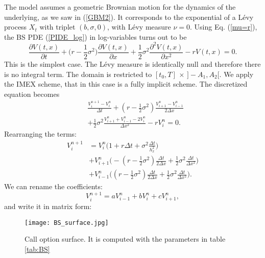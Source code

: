 The \cite{BS73} model assumes a geometric Brownian motion for the dynamics of the underlying, as we saw in (\ref{GBM2}).
It corresponds to the exponential of a Lévy process $X_t$ with triplet $(b,\sigma,0)$, with Lévy measure $\nu = 0$.
Using Eq. (\ref{mu=r}), the BS PDE (\ref{PIDE_log}) in log-variables turns out to be
\begin{equation}\label{BS_PDE}
\frac{\partial  V(t,x)}{\partial t}  
          + \biggl( r -\frac{1}{2}\sigma^2 \biggr) \frac{\partial V(t,x)}{\partial x}
          + \frac{1}{2} \sigma^2 \frac{\partial^2  V(t,x)}{\partial x^2} - r  V(t,x)  = 0.
\end{equation}
This is the simplest case. The Lévy measure is identically null and therefore there is no integral term.
The domain is restricted to $[t_0,T]\, \times \, ]-A_1,A_2[$. We apply the IMEX scheme, that in this case is a fully implicit scheme.  
The discretized equation becomes
\begin{align}
&\frac{V^{n+1}_{i} -V^{n}_{i}}{\Delta t} + 
(r-\frac{1}{2}\sigma^2) \frac{V^{n}_{i+1} -V^{n}_{i-1}}{ 2 \Delta x} \\ \nonumber
&+ \frac{1}{2} \sigma^2 \frac{V^{n}_{i+1} + V^{n}_{i-1} - 2 V^{n}_{i}}{\Delta x^2}  - r V^{n}_i = 0.
\end{align}
Rearranging the terms: 
\begin{align*}
 V^{n+1}_{i} &= V^{n}_{i} \biggl( 1 + r\Delta t + \sigma^2 \frac{\Delta t}{h_x^2} \biggr)  \\
& + V^{n}_{i+1} \biggl( -(r -\frac{1}{2}\sigma^2)\frac{\Delta t}{2 \Delta x} +
\frac{1}{2}\sigma^2 \frac{\Delta t}{\Delta x^2}  \biggr)  \\
& + V^{n}_{i-1} \biggl( (r -\frac{1}{2}\sigma^2)\frac{\Delta t}{2 \Delta x} + 
\frac{1}{2}\sigma^2 \frac{\Delta t}{\Delta x^2}  \biggr).
\end{align*}
We can rename the coefficients:
$$ V^{n+1}_{i} = a V^{n}_{i-1} + b V^{n}_{i} + c V^{n}_{i+1}, $$
and write it in matrix form:
\begin{figure}[t]
   \centering
   \texttt{[image: BS\_surface.jpg]}
   \caption{Call option surface. It is computed with the parameters in table \ref{tab:BS}}
   \label{BS_surface} 
\end{figure}
